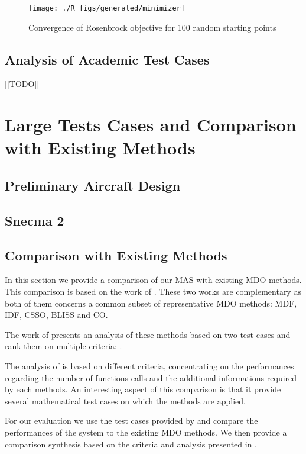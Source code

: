 \begin{figure}
\centering
    \texttt{[image: ./R\_figs/generated/minimizer]}	
	\caption{Convergence of Rosenbrock objective for 100 random starting points}
\end{figure}

\section{Analysis of Academic Test Cases}

[[TODO]]

\chapter{Large Tests Cases and Comparison with Existing Methods}

\section{Preliminary Aircraft Design}

\section{Snecma 2}

\section{Comparison with Existing Methods}

In this section we provide a comparison of our MAS with existing MDO methods. This comparison is based on the work of \cite{perez2004evaluation, Yi2008}. These two works are complementary as both of them concerns a common subset of representative MDO methods: MDF, IDF, CSSO, BLISS and CO.

The work of \cite{perez2004evaluation} presents an analysis of these methods based on two test cases and rank them on multiple criteria: .

The analysis of \cite{Yi2008} is based on different criteria, concentrating on the performances regarding the number of functions calls and the additional informations required by each methods. An interesting aspect of this comparison is that it provide several mathematical test cases on which the methods are applied.

For our evaluation we use the test cases provided by \cite{Yi2008} and compare the performances of the system to the existing MDO methods. We then provide a comparison synthesis based on the criteria and analysis presented in \cite{perez2004evaluation}.

